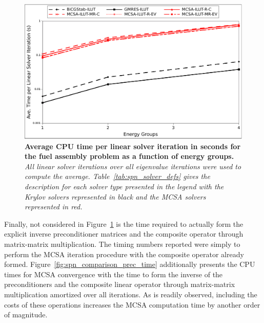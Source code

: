 \begin{figure}[t!]
  \begin{center}
    \includegraphics[width=5in]{chapters/spn_equations/solver_time.pdf}
  \end{center}
  \caption{\textbf{Average CPU time per linear solver iteration in
      seconds for the fuel assembly problem as a function of energy
      groups.}  \textit{All linear solver iterations over all
      eigenvalue iterations were used to compute the
      average. Table~\ref{tab:spn_solver_defs} gives the description
      for each solver type presented in the legend with the Krylov
      solvers represented in black and the MCSA solvers represented in
      red.}}
  \label{fig:spn_comparison_time}
\end{figure}

Finally, not considered in Figure~\ref{fig:spn_comparison_time} is the
time required to actually form the explicit inverse preconditioner
matrices and the composite operator through matrix-matrix
multiplication. The timing numbers reported were simply to perform the
MCSA iteration procedure with the composite operator already
formed. Figure~\ref{fig:spn_comparison_prec_time} additionally
presents the CPU times for MCSA convergence with the time to form the
inverse of the preconditioners and the composite linear operator
through matrix-matrix multiplication amortized over all iterations. As
is readily observed, including the costs of these operations increases
the MCSA computation time by another order of magnitude.

